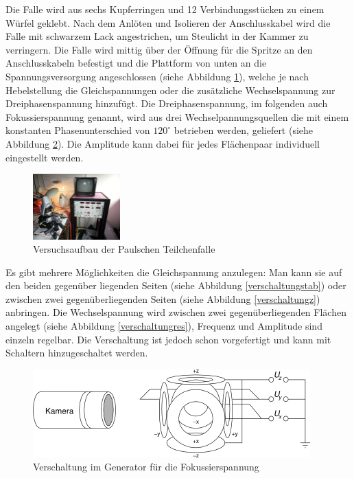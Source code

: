 \documentclass[a4paper,12pt]{article}
\begin{document}
Die Falle wird aus sechs Kupferringen und 12 Verbindungsstücken zu einem Würfel geklebt.
Nach dem Anlöten und Isolieren der Anschlusskabel wird die Falle mit schwarzem Lack angestrichen, um Steulicht in der Kammer zu verringern.
Die Falle wird mittig über der Öffnung für die Spritze an den Anschlusskabeln befestigt und die Plattform von unten an die Spannungsversorgung angeschlossen (siehe Abbildung \ref{fallenbild}), 
welche je nach Hebelstellung die Gleichspannungen oder die zusätzliche Wechselspannung zur Dreiphasenspannung hinzufügt.
Die Dreiphasenspannung, im folgenden auch Fokussierspannung genannt, wird aus drei Wechselpannungsquellen die mit einem konstanten Phasenunterschied von $120^\circ$ betrieben werden, geliefert (siehe Abbildung \ref{verschaltung3phase}).
Die Amplitude kann dabei für jedes Flächenpaar individuell eingestellt werden.

\begin{figure}[htb]
		\centering
		\includegraphics[width=0.3\textwidth]{aufbau.jpg}
		\caption{Versuchsaufbau der Paulschen Teilchenfalle}
		\label{fallenbild}
\end{figure}

Es gibt mehrere Möglichkeiten die Gleichspannung anzulegen:
Man kann sie auf den beiden gegenüber liegenden Seiten (siehe Abbildung \ref{verschaltungstab}) oder zwischen zwei 
gegenüberliegenden Seiten (siehe Abbildung \ref{verschaltungz}) anbringen.
Die Wechselspannung wird zwischen zwei gegenüberliegenden Flächen angelegt (siehe Abbildung \ref{verschaltungres}), Frequenz und Amplitude sind einzeln regelbar. 
Die Verschaltung ist jedoch schon vorgefertigt und kann mit Schaltern hinzugeschaltet werden.
\begin{figure}[htb]
		\centering
		\includegraphics{Schaltbild_3Phasen.png}
		\caption{Verschaltung im Generator für die Fokussierspannung}
		\label{verschaltung3phase}
\end{figure}
\end{document}
